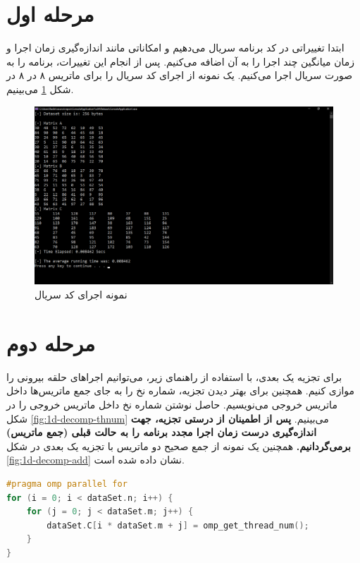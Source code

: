 \documentclass{HW}
\begin{document}
\pagestyle{pages}
\thispagestyle{first_page}

\section{مرحله اول}

ابتدا تغییراتی در کد برنامه سریال می‌دهیم و امکاناتی مانند اندازه‌گیری زمان اجرا و زمان میانگین چند اجرا را به آن اضافه می‌کنیم. پس از انجام این تغییرات، برنامه را به صورت سریال اجرا می‌کنیم. یک نمونه از اجرای کد سریال را برای ماتریس ۸ در ۸ در شکل
\ref{fig:serial}
می‌بینیم.

\begin{figure}[ht!]
\begin{center}
	\includegraphics[width=15cm]{images/serial}
\end{center}
\caption{نمونه اجرای کد سریال}
\label{fig:serial}
\end{figure}

\section{مرحله دوم}

برای تجزیه یک بعدی، با استفاده از راهنمای زیر، می‌توانیم اجراهای حلقه بیرونی را موازی کنیم. همچنین برای بهتر دیدن تجزیه، شماره نخ را به جای جمع ماتریس‌ها داخل ماتریس خروجی می‌نویسیم. حاصل نوشتن شماره نخ داخل ماتریس خروجی را در شکل
\ref{fig:1d-decomp-thnum}
می‌بینیم.
\textbf{پس از اطمینان از درستی تجزیه، جهت اندازه‌گیری درست زمان اجرا مجدد برنامه را به حالت قبلی (جمع ماتریس) برمی‌گردانیم.}
همچنین یک نمونه از جمع صحیح دو ماتریس با تجزیه یک بعدی در شکل
\ref{fig:1d-decomp-add}
نشان داده شده است.

\begin{latin}
\begin{minipage}{\linewidth}
\begin{lstlisting}[language=C]
#pragma omp parallel for
for (i = 0; i < dataSet.n; i++) {
	for (j = 0; j < dataSet.m; j++) {
		dataSet.C[i * dataSet.m + j] = omp_get_thread_num();
	}
}
\end{lstlisting}
\end{minipage}
\end{latin}
\end{document}
